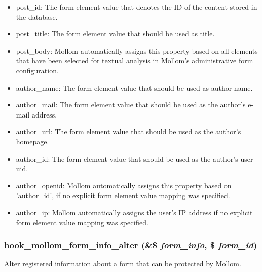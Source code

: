 \begin{Desc}
\begin{itemize}
\begin{itemize}
\item post\_\-id: The form element value that denotes the ID of the content stored in the database.\item post\_\-title: The form element value that should be used as title.\item post\_\-body: Mollom automatically assigns this property based on all elements that have been selected for textual analysis in Mollom's administrative form configuration.\item author\_\-name: The form element value that should be used as author name.\item author\_\-mail: The form element value that should be used as the author's e-mail address.\item author\_\-url: The form element value that should be used as the author's homepage.\item author\_\-id: The form element value that should be used as the author's user uid.\item author\_\-openid: Mollom automatically assigns this property based on 'author\_\-id', if no explicit form element value mapping was specified.\item author\_\-ip: Mollom automatically assigns the user's IP address if no explicit form element value mapping was specified. \end{itemize}
\end{itemize}
\end{Desc}
\hypertarget{group__mollom__api_gd0e440366ce3bd86317641b94693cbe6}{
\subsubsection[{hook\_\-mollom\_\-form\_\-info\_\-alter}]{\setlength{\rightskip}{0pt plus 5cm}hook\_\-mollom\_\-form\_\-info\_\-alter (\&\$ {\em form\_\-info}, \/  \$ {\em form\_\-id})}}
\label{group__mollom__api_gd0e440366ce3bd86317641b94693cbe6}


Alter registered information about a form that can be protected by Mollom.

